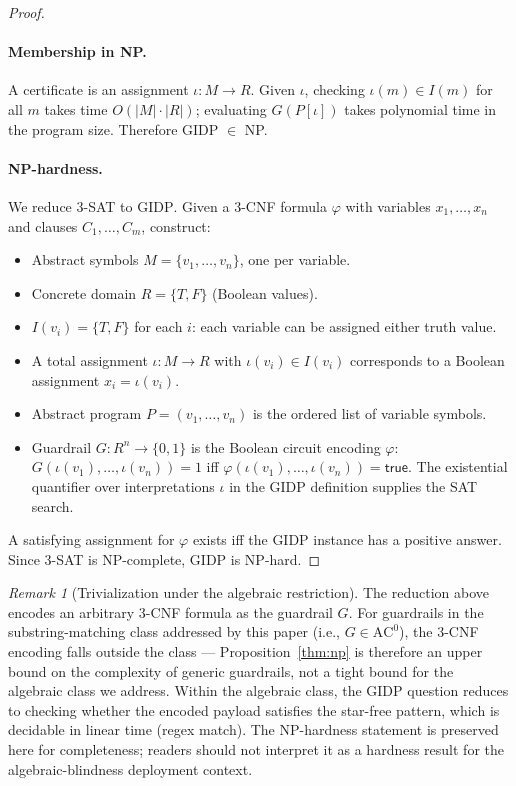 \documentclass[letterpaper,twocolumn,10pt]{article}
\theoremstyle{definition}
\theoremstyle{remark}
\newtheorem{remark}[theorem]{Remark}
\begin{document}
\begin{proof}\leavevmode
\paragraph{Membership in NP.}
A certificate is an assignment $\iota\colon M \to R$.
Given $\iota$, checking $\iota(m) \in I(m)$ for all $m$ takes time $O(|M| \cdot |R|)$;
evaluating $G(P[\iota])$ takes polynomial time in the program size.
Therefore \textsc{GIDP} $\in$ NP.

\paragraph{NP-hardness.}
We reduce 3-SAT to \textsc{GIDP}.
Given a 3-CNF formula $\varphi$ with variables $x_1, \ldots, x_n$ and clauses
$C_1, \ldots, C_m$, construct:
\begin{itemize}
  \item Abstract symbols $M = \{v_1, \ldots, v_n\}$, one per variable.
  \item Concrete domain $R = \{T, F\}$ (Boolean values).
  \item $I(v_i) = \{T, F\}$ for each $i$: each variable can be assigned
    either truth value.
  \item A total assignment $\iota\colon M \to R$ with $\iota(v_i) \in I(v_i)$
    corresponds to a Boolean assignment $x_i = \iota(v_i)$.
  \item Abstract program $P = (v_1, \ldots, v_n)$ is the ordered list of
    variable symbols.
  \item Guardrail $G\colon R^n \to \{0,1\}$ is the Boolean circuit encoding
    $\varphi$: $G(\iota(v_1), \ldots, \iota(v_n)) = 1$ iff
    $\varphi(\iota(v_1), \ldots, \iota(v_n)) = \mathsf{true}$.
    The existential quantifier over interpretations $\iota$ in the \textsc{GIDP}
    definition supplies the SAT search.
\end{itemize}
A satisfying assignment for $\varphi$ exists iff the \textsc{GIDP} instance has
a positive answer.
Since 3-SAT is NP-complete, \textsc{GIDP} is NP-hard.
\end{proof}

\begin{remark}[Trivialization under the algebraic restriction]\label{rem:gidp-trivial}
The reduction above encodes an arbitrary 3-CNF formula as the guardrail $G$.
For guardrails in the substring-matching class addressed by this paper (i.e.,
$G \in \mathrm{AC}^0$), the 3-CNF encoding falls outside the class ---
Proposition~\ref{thm:np} is therefore an upper bound on the complexity of
generic guardrails, not a tight bound for the algebraic class we address.
Within the algebraic class, the GIDP question reduces to checking whether the
encoded payload satisfies the star-free pattern, which is decidable in linear
time (regex match). The NP-hardness statement is preserved here for
completeness; readers should not interpret it as a hardness result for the
algebraic-blindness deployment context.
\end{remark}
\end{document}
